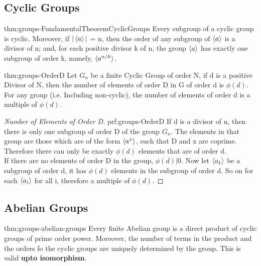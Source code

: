 \subsection{Cyclic Groups}

\begin{theorem}{thm:groups-FundamentalTheoremCyclicGroups}
    Every subgroup of a cyclic group is cyclic.
    Moreover, if $|\braket{a}|$ = n, then the order of any subgroup of $\braket{a}$ is a divisor of n; and, for each positive divisor k of n, the group $\braket{a}$ has exactly one subgroup of order k, namely, $\braket{a^{n/k}}$.
\end{theorem}

\begin{theorem}{thm:groups-OrderD}
    Let $G_n$ be a finite Cyclic Group of order N, if d is a positive Divisor of N, then the number of elements of order D in G of order d is $\phi(d)$. \vspace{5pt} \\ For any group (i.e. Including non-cyclic), the number of elements of order d is a multiple of $\phi(d)$.
\end{theorem}

\begin{proof}[Number of Elements of Order D]{prf:groups-OrderD}
    If d is a divisor of n, then there is only one subgroup of order D of the group $G_n$. The elements in that group are those which are of the form $ \braket{a^x} $, such that D and x are coprime. Therefore there can only be exactly $\phi(d)$ elements that are of order d.
    \vspace{5px} \\ If there are no elements of order D in the group, $\phi(d) | 0$. Now let $\braket{a_1}$ be a subgroup of order d, it has $\phi(d)$ elements in the subgroup of order d. So on for each $\braket{a_i}$ for all i, therefore a multiple of $\phi(d)$.
\end{proof}


\subsection{Abelian Groups}

\begin{theorem}{thm:groups-abelian-groups}
    Every finite Abelian group is a direct product of cyclic groups of prime order power. Moreover, the number of terms in the product and the orders fo the cyclic groups are uniquely determined by the group. This is valid \textbf{upto isomorphism}.
\end{theorem}

